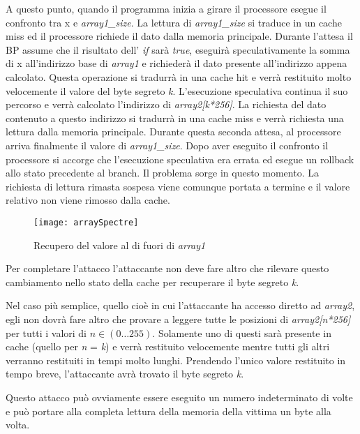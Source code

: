 			A questo punto, quando il programma inizia a girare il processore esegue il confronto tra x e \emph{array1\_size}. La lettura di \emph{array1\_size} si traduce in un cache miss ed il processore richiede il dato dalla memoria principale. Durante l'attesa il \ac{BP} assume che il risultato dell' \emph{if} sarà \emph{true}, eseguirà speculativamente la somma di x all'indirizzo base di \emph{array1} e richiederà il dato presente all'indirizzo appena calcolato. Questa operazione si tradurrà in una cache hit e verrà restituito molto velocemente il valore del byte segreto \emph{k}. L'esecuzione speculativa continua il suo percorso e verrà calcolato l'indirizzo di \emph{array2[k*256]}. La richiesta del dato contenuto a questo indirizzo si tradurrà in una cache miss e verrà richiesta una lettura dalla memoria principale. Durante questa seconda attesa, al processore arriva finalmente il valore di \emph{array1\_size}. Dopo aver eseguito il confronto il processore si accorge che l'esecuzione speculativa era errata ed esegue un rollback allo stato precedente al branch. Il problema sorge in questo momento. La richiesta di lettura rimasta sospesa viene comunque portata a termine e il valore relativo non viene rimosso dalla cache.
			
			\begin{figure}
				\begin{center}
					\texttt{[image: arraySpectre]}
					\caption{Recupero del valore al di fuori di \emph{array1}}
					\label{fig:array}
				\end{center}
			\end{figure}
			
			Per completare l'attacco l'attaccante non deve fare altro che rilevare questo cambiamento nello stato della cache per recuperare il byte segreto \emph{k}.
			
			Nel caso più semplice, quello cioè in cui l'attaccante ha accesso diretto ad \emph{array2}, egli non dovrà fare altro che provare  a leggere tutte le posizioni di \emph{array2[n*256]} per tutti i valori di $n \in (0\dots255)$. Solamente uno di questi sarà presente in cache (quello per \emph{n} = \emph{k}) e verrà restituito velocemente mentre tutti gli altri verranno restituiti in tempi molto lunghi. Prendendo l'unico valore restituito in tempo breve, l'attaccante avrà trovato il byte segreto \emph{k}.
			
			Questo attacco può ovviamente essere eseguito un numero indeterminato di volte e può portare alla completa lettura della memoria della vittima un byte alla volta.
			
